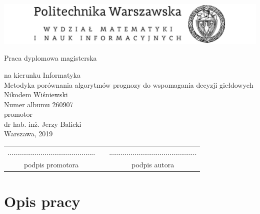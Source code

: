 \documentclass[a4paper, twoside, 11pt, openright]{article}
\newcommand{\myTitle}{Metodyka porównania algorytmów prognozy do wspomagania decyzji giełdowych}
\newcommand{\myName}{Nikodem Wiśniewski}
\newcommand{\myNumber}{260907}
\newcommand{\myThesisType}{Praca dyplomowa magisterska}
\newcommand{\myCourse}{Informatyka}
\newcommand{\myProf}{dr hab. inż. Jerzy Balicki}
\newcommand{\myYear}{2019}
\newcommand{\fncyfront}{%
	\fancyhead[RO]{}
	\fancyfoot[RO]{}
	\fancyhead[LE]{}
	\fancyfoot[LE]{}
	\fancyhead[RE,LO]{}
	\fancyfoot[C]{}
	\renewcommand{\headrulewidth}{0pt}}
\newcommand{\fncymain}{%
	\fancyhead[RO]{{\footnotesize \rightmark}}
	\fancyfoot[RO]{\thepage}
	\fancyhead[LE]{{\footnotesize \leftmark}}
	\fancyfoot[LE]{\thepage}
	\fancyfoot[C]{}
	\renewcommand{\headrulewidth}{0.3pt}}
\begin{document}
\fncyfront
\begin{titlepage}
\begingroup
\begin{center}		
			\includegraphics[width=1.0\textwidth]{img/pw_header}
			
			\vspace{1.0cm}
			\fontsize{24}{30}\selectfont\myThesisType
			\fontsize{12}{14}\selectfont
			
			\vspace{0.5cm}
			na kierunku \myCourse \\
			\vspace{1cm}
			{\fontsize{14}{18}\selectfont \myTitle} \\ 
			
			\vspace{1.5cm}
			\fontsize{21}{25}\selectfont \myName \\
			\fontsize{12}{14}\selectfont
			Numer albumu \myNumber \\

			\vspace{6.5cm}
			promotor \\
			\myProf \\
			\vspace{0.5cm}
			\vfill 
			Warszawa, \myYear
        \vfill                      
\end{center}
\endgroup
\end{titlepage}

\newpage
\hfill
\begin{table}[b]
\centering
\begin{tabular}[t]{ccc}
............................................. & \hspace*{100pt} & .............................................\\
podpis promotora & \hspace*{100pt} & podpis autora
\end{tabular}
\end{table}

\fncymain

\newpage

\section{Opis pracy}
\end{document}
